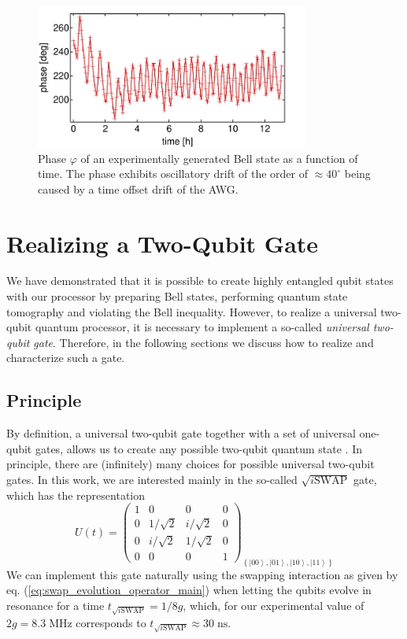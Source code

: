 \begin{figure}
	\centering
	\includegraphics[width=9cm]{"./data/ct5/2011_03_17 - chsh/chsh_drift"}
	\caption[]{Phase $\varphi$ of an experimentally generated Bell state as a function of time. The phase exhibits oscillatory drift of the order of $\approx 40^\circ$ being caused by a time offset drift of the AWG.}
	\label{fig:chsh_drift}
\end{figure}

\section{Realizing a Two-Qubit Gate}

We have demonstrated that it is possible to create highly entangled qubit states with our processor by preparing Bell states, performing quantum state tomography and violating the Bell inequality. However, to realize a universal two-qubit quantum processor, it is necessary to implement a so-called {\it universal two-qubit gate}. Therefore, in the following sections we discuss how to realize and characterize such a gate.

\subsection{Principle}

By definition, a universal two-qubit gate together with a set of universal one-qubit gates, allows us to create any possible two-qubit quantum state \citep{barenco_elementary_1995}. In principle, there are (infinitely) many choices for possible universal two-qubit gates. In this work, we are interested mainly in the so-called $\sqrt{i\mathrm{SWAP}}$ gate, which has the representation
%
\begin{equation}
U(t)=\left(\begin{array}{cccc}
1 & 0 & 0 & 0\\
0 & 1/\sqrt{2} & i/\sqrt{2} & 0\\
0 & i/\sqrt{2} & 1/\sqrt{2} & 0\\
0 & 0 & 0 & 1\end{array}\right)_{\left\{ \left|00\right\rangle ,\left|01\right\rangle ,\left|10\right\rangle ,\left|11\right\rangle \right\} } \label{eq:sqrt_iswap_gate_main}
\end{equation}
%
We can implement this gate naturally using the swapping interaction as given by eq. (\ref{eq:swap_evolution_operator_main}) when letting the qubits evolve in resonance for a time $t_{\sqrt{i\mathrm{SWAP}}}=1/8g$, which, for our experimental value of $2g = 8.3\;\mathrm{MHz}$ corresponds to $t_{\sqrt{i\mathrm{SWAP}}}\approx 30\;\mathrm{ns}$. 


